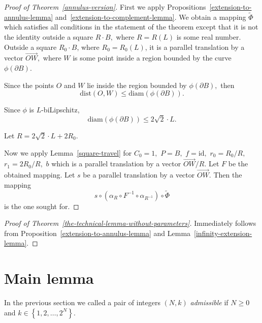 \documentclass[12pt]{article}
\theoremstyle{definition}
\begin{document}
\begin{proof}[Proof of Theorem~\ref{annulus-version}]
First we apply Propositions~\ref{extension-to-annulus-lemma} and~\ref{extension-to-complement-lemma}. We obtain a mapping $\widetilde \Phi$ which satisfies all conditions in the statement of the theorem except that it is not the identity outside a square $R\cdot B,$ where $R = R(L)$ is some real number. Outside a square $R_0\cdot B$, where $R_0 = R_0(L)$, it is a parallel translation by a vector $\overrightarrow{OW},$ where $W$ is some point inside a region bounded by the curve $\phi(\partial B).$

Since the points $O$ and $W$ lie inside the region bounded by $\phi(\partial B),$ then
$$
\mathrm{dist}(O,W) \le \mathrm{diam}(\phi(\partial B)).
$$

Since $\phi$ is $L$-biLipschitz,
$$
\mathrm{diam}(\phi(\partial B))\le 2\sqrt2\cdot L.
$$

Let $R = 2\sqrt2\cdot L + 2R_0.$

Now we apply Lemma~\ref{square-travel} for $C_0 = 1,$ $P = B,$ $f = \mathrm{id},$ $r_0 = R_0/R,$ $r_1 = 2R_0/R,$ $b$ which is a parallel translation by a vector $\overrightarrow{OW}/R.$ Let $F$ be the obtained mapping. Let $s$ be a parallel translation by a vector $\overrightarrow{OW}.$ Then the mapping
$$
s \circ\left(\alpha_R\circ F^{-1}\circ\alpha_{R^{-1}} \right)\circ\widetilde\Phi
$$
is the one sought for.
\end{proof}

\begin{proof}[Proof of Theorem~\ref{the-technical-lemma-without-parameters}]
Immediately follows from Proposition~\ref{extension-to-annulus-lemma} and Lemma~\ref{infinity-extension-lemma}.
\end{proof}

\section{Main lemma}
\label{main-lemma-section}

In the previous section we called a pair of integers $(N, k)$ {\it admissible} if $N\ge 0$ and $k\in\left\lbrace1, 2, \dots, 2^N\right\rbrace.$
\end{document}
